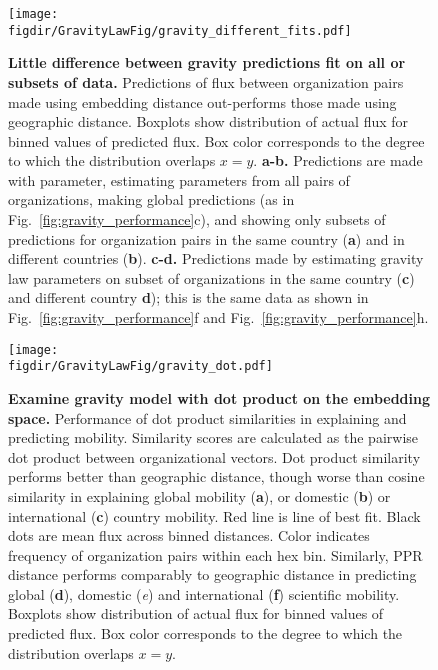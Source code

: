 \documentclass[12pt]{article} %
\def\figdir{../Figs}
\begin{document}
%
%
\begin{figure}[p!]
	\centering
	\texttt{[image: \\figdir/GravityLawFig/gravity\_different\_fits.pdf]}
	\caption{
		\textbf{Little difference between gravity predictions fit on all or subsets of data.}
		Predictions of flux between organization pairs made using embedding distance out-performs those made using geographic distance.
		Boxplots show distribution of actual flux for binned values of predicted flux.
		Box color corresponds to the degree to which the distribution overlaps $x = y$.
		\textbf{a-b.} Predictions are made with parameter, estimating parameters from all pairs of organizations, making global predictions (as in Fig.~\ref{fig:gravity_performance}c), and showing only subsets of predictions for organization pairs in the same country (\textbf{a}) and in different countries (\textbf{b}).
		\textbf{c-d.} Predictions made by estimating gravity law parameters on subset of organizations in the same country (\textbf{c}) and different country \textbf{d});
		this is the same data as shown in Fig.~\ref{fig:gravity_performance}f and Fig.~\ref{fig:gravity_performance}h.
	}
	\label{fig:supp:gravity_prediction_subsets}
\end{figure}



%
%
\begin{figure}[p!]
	\centering
	\texttt{[image: \\figdir/GravityLawFig/gravity\_dot.pdf]}
	\caption{
		\textbf{Examine gravity model with dot product on the embedding space.}
		Performance of dot product similarities in explaining and predicting mobility.
		Similarity scores are calculated as the pairwise dot product between organizational vectors.
		Dot product similarity performs better than geographic distance, though worse than cosine similarity in explaining global mobility (\textbf{a}), or domestic (\textbf{b}) or international (\textbf{c}) country mobility.
		Red line is line of best fit.
		Black dots are mean flux across binned distances.
		Color indicates frequency of organization pairs within each hex bin.
		Similarly, PPR distance performs comparably to geographic distance in predicting global (\textbf{d}), domestic (\textit{e}) and international (\textbf{f}) scientific mobility.
		Boxplots show distribution of actual flux for binned values of predicted flux.
		Box color corresponds to the degree to which the distribution overlaps $x = y$.
	}
	\label{fig:supp:gravity_dot}
\end{figure}
\end{document}
